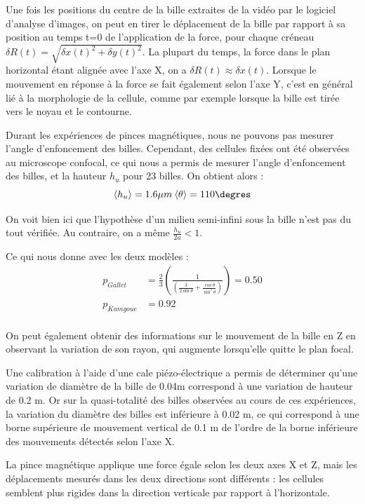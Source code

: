Une fois les positions du centre de la bille extraites de la vidéo par le logiciel d'analyse d'images, on peut en tirer le déplacement de la bille par rapport à sa position au temps t=0 de l'application de la force, pour chaque créneau $\delta R(t)=\sqrt{\delta x(t)^2+\delta y(t)^2}$. 
La plupart du temps, la force dans le plan horizontal étant alignée avec l'axe X, on a $\delta R(t) \approx \delta x(t)$. Lorsque le mouvement en réponse à la force se fait également selon l'axe Y, c'est en général lié à la morphologie de la cellule, comme par exemple lorsque la bille est tirée vers le noyau et le contourne. 
 
Durant les expériences de pinces magnétiques, nous ne pouvons pas mesurer l'angle d'enfoncement des billes. Cependant, des cellules fixées ont été observées au microscope confocal, ce qui nous a permis de mesurer l'angle d'enfoncement des billes, et la hauteur $h_u$ pour 23 billes. On obtient alors : 
$$ \langle h_u \rangle = 1.6 \mu m \: \langle \theta \rangle = 110 \degres$$

On voit bien ici que l'hypothèse d'un milieu semi-infini sous la bille n'est pas du tout vérifiée. Au contraire, on a même $\frac{h_u}{2a} <1$. 

Ce qui nous donne avec les deux modèles : 
\begin{align}
 p_{Gallet}&=\frac{2}{3}\left(\frac{1}{\left( \frac{3}{2 \sin \theta}+\frac{\cos \theta}{\sin^3 \theta}\right)} \right) = 0.50 \\
p_{Kamgoue}&= 0.92\\
\end{align}

On peut également obtenir des informations sur le mouvement de la bille en Z en observant la variation de son rayon, qui augmente lorsqu'elle quitte le plan focal. 

Une calibration à l'aide d'une cale piézo-électrique a permis de déterminer qu'une variation de diamètre de la bille de 0.04\micro m correspond à une variation de hauteur de 0.2 \micro m. 
Or sur la quasi-totalité des billes observées au cours de ces expériences, la variation du diamètre des billes est inférieure à 0.02 \micro m, ce qui correspond à une borne supérieure de mouvement vertical de 0.1 \micro m de l'ordre de la borne inférieure des mouvements détectés selon l'axe X. 

La pince magnétique applique une force égale selon les deux axes X et Z, mais les déplacements mesurés dans les deux directions sont différents : les cellules semblent plus rigides dans la direction verticale par rapport à l'horizontale. 

